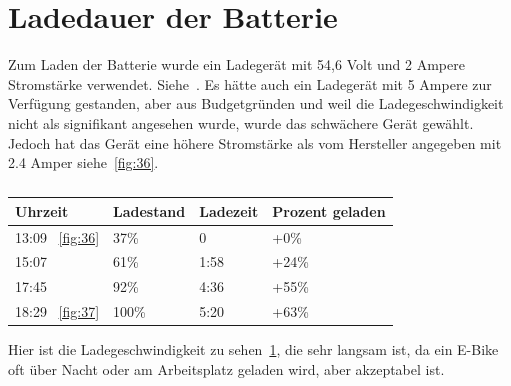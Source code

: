 \section{Ladedauer der Batterie}

Zum Laden der Batterie wurde ein Ladegerät mit 54,6 Volt und 2 Ampere Stromstärke verwendet.
Siehe~\cite{noauthor_uurrpp_nodate}.
Es hätte auch ein Ladegerät mit 5 Ampere zur Verfügung gestanden, aber aus Budgetgründen und weil die Ladegeschwindigkeit nicht als signifikant angesehen wurde, wurde das schwächere Gerät gewählt.
Jedoch hat das Gerät eine höhere Stromstärke als vom Hersteller angegeben mit 2.4 Amper siehe~\ref{fig:36}.
\begin{table}[h]
\begin{tabular}{l|lll}
Uhrzeit & Ladestand & Ladezeit & Prozent geladen \\ \hline
13:09 ~\ref{fig:36}   & 37\%      & 0        & +0\%            \\
15:07   & 61\%      & 1:58     & +24\%           \\
17:45   & 92\%      & 4:36     & +55\%           \\
18:29 ~\ref{fig:37}   & 100\%     & 5:20     & +63\%
\end{tabular}
\caption{}
\label{tab:my-table}
\end{table}

Hier ist die Ladegeschwindigkeit zu sehen~\ref{tab:my-table}, die sehr langsam ist, da ein E-Bike oft über Nacht oder am Arbeitsplatz geladen wird, aber akzeptabel ist.




